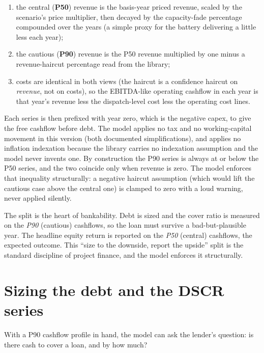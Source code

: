 \begin{enumerate}
  \item the central (\textbf{P50}) revenue is the basis-year priced revenue, scaled by the scenario's price multiplier, then decayed by the capacity-fade percentage compounded over the years (a simple proxy for the battery delivering a little less each year);
  \item the cautious (\textbf{P90}) revenue is the P50 revenue multiplied by one minus a revenue-haircut percentage read from the library;
  \item costs are identical in both views (the haircut is a confidence haircut on \emph{revenue}, not on costs), so the EBITDA-like operating cashflow in each year is that year's revenue less the dispatch-level cost less the operating cost lines.
\end{enumerate}

Each series is then prefixed with year zero, which is the negative capex, to give the free cashflow before debt. The model applies no tax and no working-capital movement in this version (both documented simplifications), and applies no inflation indexation because the library carries no indexation assumption and the model never invents one. By construction the P90 series is always at or below the P50 series, and the two coincide only when revenue is zero. The model enforces that inequality structurally: a negative haircut assumption (which would lift the cautious case above the central one) is clamped to zero with a loud warning, never applied silently.

\begin{keyidea}
The split is the heart of bankability. Debt is sized and the cover ratio is measured on the \emph{P90} (cautious) cashflows, so the loan must survive a bad-but-plausible year. The headline equity return is reported on the \emph{P50} (central) cashflows, the expected outcome. This ``size to the downside, report the upside'' split is the standard discipline of project finance, and the model enforces it structurally.
\end{keyidea}

\section{Sizing the debt and the DSCR series}

With a P90 cashflow profile in hand, the model can ask the lender's question: is there cash to cover a loan, and by how much?

